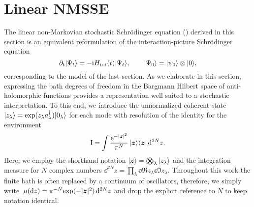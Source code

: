 \section{Linear NMSSE}
\label{sec:nmqsd.lin_nmsse}
%

The linear non-Markovian stochastic Schrödinger equation (\NMSSE) derived in this section is an equivalent reformulation of the interaction-picture Schrödinger equation
\begin{equation}
  \partial_t | \Psi_t \rangle = -\mathrm{i} H_\mathrm{tot}(t) | \Psi_t \rangle, \qquad | \Psi_0 \rangle = | \psi_0 \rangle \otimes | 0 \rangle,
  \label{eq:nmqsd.schroedinger_ia}
\end{equation}
corresponding to the model of the last section.
As we elaborate in this section, expressing the bath degrees of freedom in the Bargmann Hilbert space of anti-holomorphic functions\cite{Ba61_coherent_states} provides a representation well suited to a stochastic interpretation.
To this end, we introduce the unnormalized coherent state $\ket{z_\lambda} = \exp(z_\lambda \adj{a}_\lambda)\ket{0_\lambda}$ for each mode with resolution of the identity for the environment
\begin{equation}
  \unit = \int \frac{\exp[-\abs{\zz}^2]}{\pi^N} \, \ket{\zz}\bra{\zz} \dd^{2N}z.
  \label{eq:nmqsd.identity}
\end{equation}
Here, we employ the shorthand notation $| \boldsymbol{z} \rangle = \bigotimes_\lambda | z_\lambda \rangle$ and the  integration measure for $N$ complex numbers $\dd^{2N}z = \prod_\lambda \dd\Re z_\lambda \dd\Im z_\lambda$.
Throughout this work the finite bath is often replaced by a continuum of oscillators, therefore, we simply write $\mudz = \pi^{-N} \exp(-\abs{\vec z}^2) \dd^{2N}z$ and drop the explicit reference to $N$ to keep notation identical.

